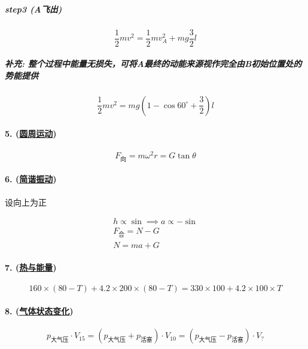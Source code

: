 \subparagraph{step3 (A飞出)}

\begin{equation*}
    \frac12mv^2=\frac12mv_A^2+mg\frac32l
\end{equation*}

\subparagraph{补充: 整个过程中能量无损失，可将A最终的动能来源视作完全由B初始位置处的势能提供}

\begin{equation*}
    \frac12mv^2=mg\left(1-\cos60^\circ+\frac32\right)l
\end{equation*}

\paragraph{5. (\hyperref[subsec:圆周运动]{圆周运动})}

\begin{equation*}
    F_\text{向}=m\omega^2r=G\tan\theta
\end{equation*}

\paragraph{6. (\hyperref[subsec:简谐振动]{简谐振动})} 设向上为正

\begin{gather*}
    h\propto \sin\implies a\propto -\sin\\
    F_\text{合}=N-G\\
    N=ma+G
\end{gather*}

\paragraph{7. (\hyperref[sec:热与能量]{热与能量})}

\begin{equation*}
    160\times(80-T)+4.2\times200\times(80-T)=330\times100+4.2\times100\times T
\end{equation*}

\paragraph{8. (\hyperref[subsec:气体状态变化]{气体状态变化})}

\begin{equation*}
    p_\text{大气压}\cdot V_{15}=(p_\text{大气压}+p_\text{活塞})\cdot V_{10}=(p_\text{大气压}-p_\text{活塞})\cdot V_?
\end{equation*}

